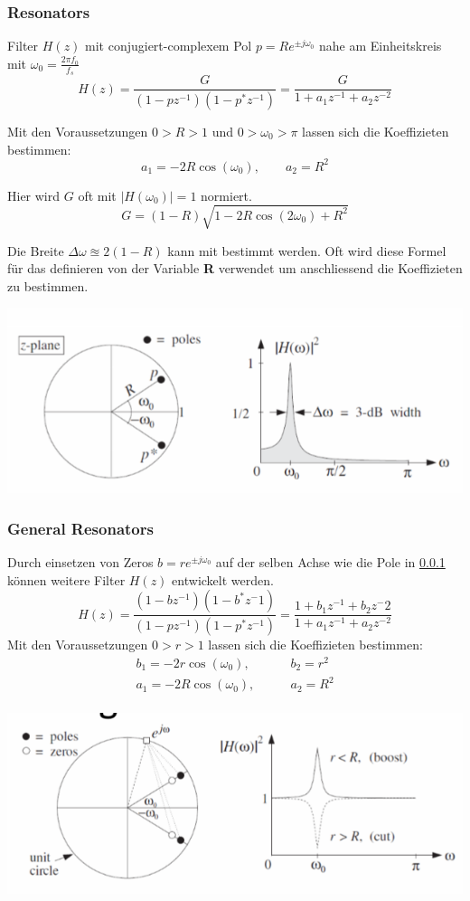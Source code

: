 \subsubsection{Resonators}\label{sec:resonators}
Filter $H(z)$ mit conjugiert-complexem Pol $p = Re^{\pm j\omega_0}$ nahe am Einheitskreis mit $\omega_0 = \frac{2\pi f_0}{f_s}$
\[
H(z) = \frac{G}{(1-pz^{-1})(1-p^*z^{-1})} = \frac{G}{1+a_1z^{-1}+a_2z^{-2}}
\]

Mit den Voraussetzungen $0\gt R\gt 1$ und $0\gt \omega_0 \gt \pi$ lassen sich die Koeffizieten bestimmen:
\[
a_1 = -2R\cos(\omega_0), \qquad a_2 = R^2
\]

Hier wird $G$ oft mit $\left|H(\omega_0)\right| = 1$ normiert.
\[
G = (1-R)\sqrt{1-2R\cos(2\omega_0)+R^2}
\]

Die Breite $\Delta\omega \approxeq 2(1-R)$ kann mit bestimmt werden. Oft wird diese Formel für das definieren von der Variable \textbf{R} verwendet um anschliessend die Koeffizieten zu bestimmen.

\begin{center}
	\includegraphics[width=0.8\columnwidth]{Images/resonator}
\end{center}


\subsubsection{General Resonators}
Durch einsetzen von Zeros $b = re^{\pm j\omega_0}$ auf der selben Achse wie die Pole in \ref{sec:resonators} können weitere Filter $H(z)$ entwickelt werden.
\[
H(z) = \frac{(1-bz^{-1})(1-b^*z^-1)}{(1-pz^{-1})(1-p^*z^{-1})} =  \frac{1+b_1z^{-1}+b_2z^-2}{1+a_1z^{-1}+a_2z^{-2}}
\]
Mit den Voraussetzungen $0\gt r\gt 1$ lassen sich die Koeffizieten bestimmen:
\begin{align*}
	b_1 = -2r\cos(\omega_0), &\qquad b_2 = r^2 \\
	a_1 = -2R\cos(\omega_0), &\qquad a_2 = R^2 \\
\end{align*}

\begin{center}
	\includegraphics[width=0.8\columnwidth]{Images/general_resonators}
\end{center}

